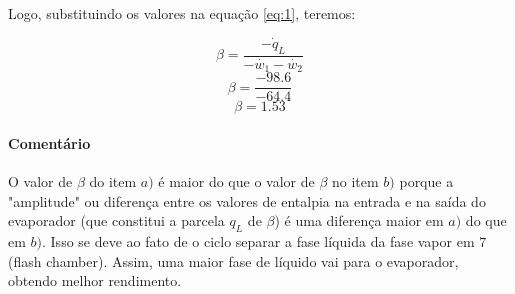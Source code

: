 \documentclass[a4paper, 12pt]{article}
\begin{document}
Logo, substituindo os valores na equação \ref{eq:1}, teremos:

\[\beta = \frac{ -\dot{q}_{L}  }{ -\dot{w_{1}} - \dot{w_{2}} }\]
\[\beta = \frac{ -98.6  }{ -64.4 } \]
\[\beta = 1.53\]

\paragraph*{Comentário}
O valor de $\beta$ do item $a)$ é maior do que o valor de $\beta$ no item $b)$ porque a "amplitude" ou diferença entre os valores de entalpia na entrada e na saída do evaporador (que constitui a parcela $q_{L}$ de $\beta$) é uma diferença maior em $a)$ do que em $b)$. Isso se deve ao fato de o ciclo separar a fase líquida da fase vapor em $7$ (flash chamber). Assim, uma maior fase de líquido vai para o evaporador, obtendo melhor rendimento.
\end{document}
